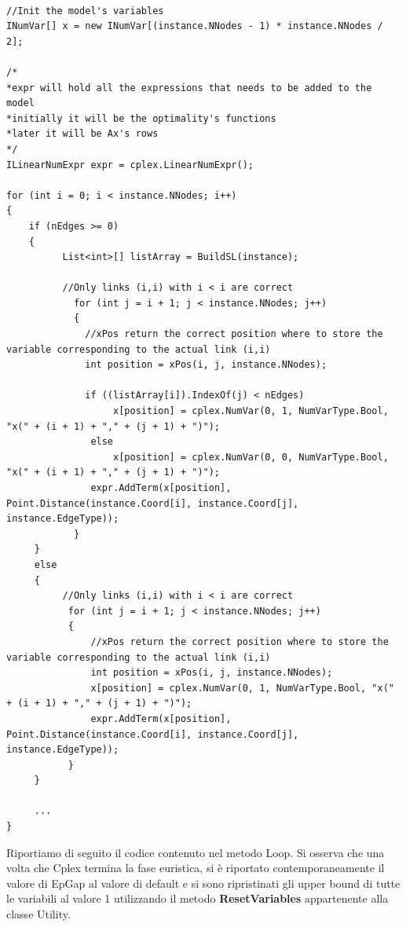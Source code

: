 \documentclass[11pt]{article}
\begin{document}
\begin{lstlisting}

//Init the model's variables
INumVar[] x = new INumVar[(instance.NNodes - 1) * instance.NNodes / 2];

/*
*expr will hold all the expressions that needs to be added to the model
*initially it will be the optimality's functions
*later it will be Ax's rows 
*/
ILinearNumExpr expr = cplex.LinearNumExpr();

for (int i = 0; i < instance.NNodes; i++)
{
    if (nEdges >= 0)
    {
          List<int>[] listArray = BuildSL(instance);

          //Only links (i,i) with i < i are correct
            for (int j = i + 1; j < instance.NNodes; j++)
            {
              //xPos return the correct position where to store the variable corresponding to the actual link (i,i)
              int position = xPos(i, j, instance.NNodes);
            
              if ((listArray[i]).IndexOf(j) < nEdges)
                   x[position] = cplex.NumVar(0, 1, NumVarType.Bool, "x(" + (i + 1) + "," + (j + 1) + ")");
               else
                   x[position] = cplex.NumVar(0, 0, NumVarType.Bool, "x(" + (i + 1) + "," + (j + 1) + ")");
               expr.AddTerm(x[position], Point.Distance(instance.Coord[i], instance.Coord[j], instance.EdgeType));
            }
     }
     else
     {
          //Only links (i,i) with i < i are correct
           for (int j = i + 1; j < instance.NNodes; j++)
           {
               //xPos return the correct position where to store the variable corresponding to the actual link (i,i)
               int position = xPos(i, j, instance.NNodes);
               x[position] = cplex.NumVar(0, 1, NumVarType.Bool, "x(" + (i + 1) + "," + (j + 1) + ")");
               expr.AddTerm(x[position], Point.Distance(instance.Coord[i], instance.Coord[j], instance.EdgeType));
           }
     }
     
     ...
}

\end{lstlisting}


Riportiamo di seguito il codice contenuto nel metodo Loop. Si osserva che una volta che Cplex termina la fase euristica, si è riportato contemporaneamente il valore di EpGap al valore di default e si sono ripristinati gli upper bound di tutte le variabili al valore 1 utilizzando il metodo \textbf{ResetVariables} appartenente alla classe Utility.
\end{document}
